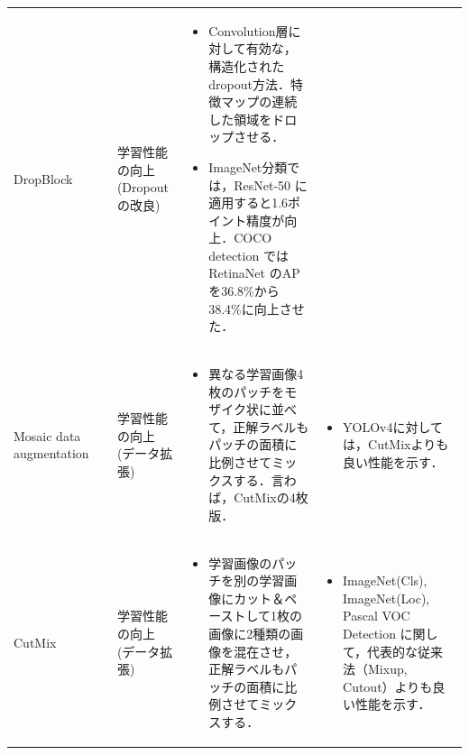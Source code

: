 \documentclass[originalpaper,fleqn]{jsaiart}     %
\begin{document}
\begin{table}
\begin{center}
\begin{tabularx}{\linewidth}{Xp{1.5cm}Xp{7cm}X}
            DropBlock & \cite{GLL18} & 学習性能の向上 (Dropout の改良) & 
            \begin{itemize}
                \vspace{-0.7\baselineskip}
                \setlength{\leftskip}{-3mm}
                \item Convolution層に対して有効な，構造化されたdropout方法．特徴マップの連続した領域をドロップさせる．
                \item ImageNet分類では，ResNet-50 に適用すると1.6ポイント精度が向上．COCO detection では RetinaNet のAPを36.8\%から38.4\%に向上させた．
            \end{itemize}
            &
            \\

            Mosaic data augmentation & \cite{BWL20} & 学習性能の向上 (データ拡張) & 
            \begin{itemize}
                \vspace{-0.7\baselineskip}
                \setlength{\leftskip}{-3mm}
                \item 異なる学習画像4枚のパッチをモザイク状に並べて，正解ラベルもパッチの面積に比例させてミックスする．言わば，CutMixの4枚版．
            \end{itemize}
            &
            \begin{itemize}
                \vspace{-0.7\baselineskip}
                \setlength{\leftskip}{-3mm}
                \item YOLOv4に対しては，CutMixよりも良い性能を示す．
            \end{itemize}
            \\

            CutMix & \cite{YHCOYC19} & 学習性能の向上 (データ拡張) & 
            \begin{itemize}
                \vspace{-0.7\baselineskip}
                \setlength{\leftskip}{-3mm}
                \item 学習画像のパッチを別の学習画像にカット＆ペーストして1枚の画像に2種類の画像を混在させ，正解ラベルもパッチの面積に比例させてミックスする．
            \end{itemize}
            &
            \begin{itemize}
                \vspace{-0.7\baselineskip}
                \setlength{\leftskip}{-3mm}
                \item ImageNet(Cls), ImageNet(Loc), Pascal VOC Detection に関して，代表的な従来法（Mixup, Cutout）よりも良い性能を示す．
            \end{itemize}
            \\


\end{tabularx}
\end{center}
\end{table}
\end{document}

